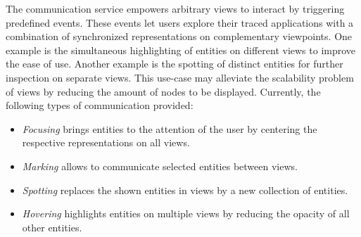 The communication service empowers arbitrary views to interact by triggering
predefined events. These events let users explore their traced applications
with a combination of synchronized representations on complementary viewpoints.
One example is the simultaneous highlighting of entities on different views to
improve the ease of use. Another example is the spotting of distinct entities
for further inspection on separate views. This use-case may alleviate the
scalability problem of views by reducing the amount of nodes to be displayed.
Currently, the following types of communication provided:

\begin{itemize}
	\item \textit{Focusing} brings entities to the attention of the user by
centering the respective representations on all views.
	\item \textit{Marking} allows to communicate selected entities between views.
	\item \textit{Spotting} replaces the shown entities in views by a new
collection of entities.
	\item \textit{Hovering} highlights entities on multiple views by reducing the
opacity of all other entities.
\end{itemize}